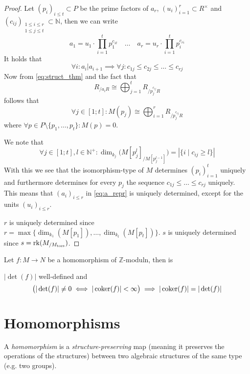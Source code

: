 \begin{proof}
   Let \((p_i)_{i \leq t} \subset P\) be the prime factors of \(a_r\), \((u_i)_{i=1}^r \subset R^\times\) and \((c_{ij})_{\substack{1 \leq i \leq r\\1 \leq j \leq t}} \subset \mathbb{N}\), then we can write
   \begin{equation}\label{eq:a_repr}
      a_1 = u_1 \cdot \prod_{i = 1}^t p_1^{c_{1t}} \quad\ldots\quad a_r = u_r \cdot \prod_{i=1}^t p_i^{c_{ri}}
   \end{equation}
   It holds that
   \[\forall i: a_i | a_{i+1} \implies \forall j: c_{1j} \leq c_{2j} \leq \ldots \leq c_{rj}\]
   Now from \cref{eq:struct_thm} and the fact that
   \[R_{/a_iR} \cong \bigoplus_{j=1}^t R_{/p_j^{c_{ij}}R}\]
   follows that
   \begin{equation}\label{eq:prim_tors}
      \forall j \in [1; t]: M(p_j) \cong \bigoplus_{i=1}^r R_{/p_j^{c_{ij}}R}
   \end{equation}
   where \(\forall p \in P \setminus \{p_1, \ldots, p_t\}: M(p) = 0\).

   We note that
   \[\forall j \in [1; t], l \in \mathbb{N}^+: \dim_{k_j}\Big(M[p_j^l]_{/M[p_j^{l-1}]}\Big) = |\{i \mid c_{ij} \geq l\}|\]
   With this we see that the isomorphism-type of \(M\) determines \((p_i)_{i=1}^t\) uniquely and furthermore determines for every \(p_j\) the sequence \(c_{1j} \leq \ldots \leq c_{rj}\) uniquely.
   This means that \((a_i)_{i\leq r}\) in \cref{eq:a_repr} is uniquely determined, except for the units \((u_i)_{i \leq r}\).

   \(r\) is uniquely determined since \(r = \max\{\dim_{k_1}(M[p_1]), \ldots, \dim_{k_t}(M[p_t])\}\).
   \(s\) is uniquely determined since \(s = \operatorname{rk}(M_{/M_{\operatorname{tors}}})\).
\end{proof}

\begin{corollary}
   Let \(f: M \to N\) be a homomorphism of \(\mathbb{Z}\)-moduln, then is

   \(|\det(f)|\) well-defined and
   \[\big(|\det(f)| \neq 0 \iff |\operatorname{coker}(f)| < \infty\big) \implies |\operatorname{coker}(f)| = |\det(f)|\]
\end{corollary}

\section{Homomorphisms}
A \emph{homomorphism} is a \emph{structure-preserving} map (meaning it preserves the operations of the structures) between two algebraic structures of the same type (e.g. two groups).

